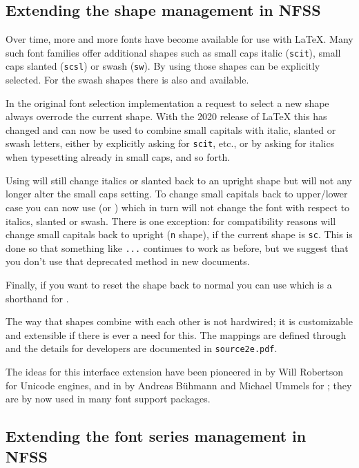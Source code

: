 \documentclass{ltnews}
\providecommand\pdfTeX{\hologo{pdfTeX}}
\begin{document}
\subsection{Extending the shape management in NFSS}

Over time, more and more fonts have become available for use with
\LaTeX{}. Many such font families offer additional shapes such as small
caps italic (\texttt{scit}), small caps slanted (\texttt{scsl}) or
swash (\texttt{sw}).
By using  those shapes can
be explicitly selected. For the swash shapes there is also
 and  available.

In the original font selection implementation a request to select a new shape
always overrode the current shape. With the 2020 release of \LaTeX{}
this has changed and  can now be used to combine small
capitals with italic, slanted or swash letters, either by explicitly
asking for \texttt{scit}, etc., or by asking for italics when typesetting
already in small caps, and so forth.

Using  will still change italics or slanted back to an
upright shape but will not any longer alter the small caps setting. To
change small capitals back to upper/lower case you can now use
 (or ) which in turn will not change the font
with respect to italics, slanted or swash.
%
There is one exception: for compatibility reasons  will
change small capitals back to upright (\texttt{n} shape), if the
current shape is \texttt{sc}. This is done so that something like
\allowbreak\texttt{...}\allowbreak{} continues
to work as before, but we suggest that you don't use that deprecated method in
new documents.


Finally, if you want to
reset the shape back to normal you can use  which is a
shorthand for .

The way that shapes combine with each other is not hardwired; it is
customizable and extensible if there is ever a need for this. The
mappings
are defined through  and the
details for developers are documented in \texttt{source2e.pdf}.

The ideas for this interface extension have been pioneered in
 by Will Robertson for Unicode engines, and in
 by Andreas Bühmann and Michael Ummels for \pdfTeX{};
they are by now used in many font support packages.


\subsection{Extending the font series management in NFSS}
\end{document}
